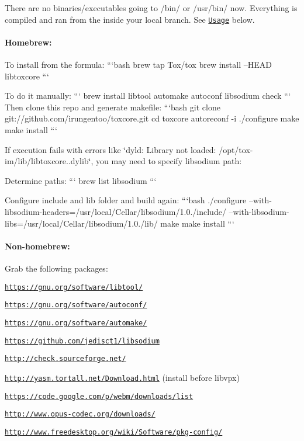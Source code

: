 There are no binaries/executables going to /bin/ or /usr/bin/ now. Everything is compiled and ran from the inside your local branch. See \href{#usage}{\tt Usage} below. \label{_homebrew}%
 \paragraph*{Homebrew\+:}

To install from the formula\+: ```bash brew tap Tox/tox brew install --H\+E\+A\+D libtoxcore ```

To do it manually\+: ``` brew install libtool automake autoconf libsodium check ``` Then clone this repo and generate makefile\+: ```bash git clone git\+://github.com/irungentoo/toxcore.\+git cd toxcore autoreconf -\/i ./configure make make install ```

If execution fails with errors like \char`\"{}dyld\+: Library not loaded\+: /opt/tox-\/im/lib/libtoxcore..\+dylib\char`\"{}, you may need to specify libsodium path\+:

Determine paths\+: ``` brew list libsodium ```

Configure include and lib folder and build again\+: ```bash ./configure --with-\/libsodium-\/headers=/usr/local/\+Cellar/libsodium/1.0./include/ --with-\/libsodium-\/libs=/usr/local/\+Cellar/libsodium/1.0./lib/ make make install ```

\label{_non-homebrew}%
 \paragraph*{Non-\/homebrew\+:}

Grab the following packages\+:
\begin{DoxyItemize}
\item \href{https://gnu.org/software/libtool/}{\tt https\+://gnu.\+org/software/libtool/}
\item \href{https://gnu.org/software/autoconf/}{\tt https\+://gnu.\+org/software/autoconf/}
\item \href{https://gnu.org/software/automake/}{\tt https\+://gnu.\+org/software/automake/}
\item \href{https://github.com/jedisct1/libsodium}{\tt https\+://github.\+com/jedisct1/libsodium}
\item \href{http://check.sourceforge.net/}{\tt http\+://check.\+sourceforge.\+net/}
\item \href{http://yasm.tortall.net/Download.html}{\tt http\+://yasm.\+tortall.\+net/\+Download.\+html} (install before libvpx)
\item \href{https://code.google.com/p/webm/downloads/list}{\tt https\+://code.\+google.\+com/p/webm/downloads/list}
\item \href{http://www.opus-codec.org/downloads/}{\tt http\+://www.\+opus-\/codec.\+org/downloads/}
\item \href{http://www.freedesktop.org/wiki/Software/pkg-config/}{\tt http\+://www.\+freedesktop.\+org/wiki/\+Software/pkg-\/config/}
\end{DoxyItemize}

